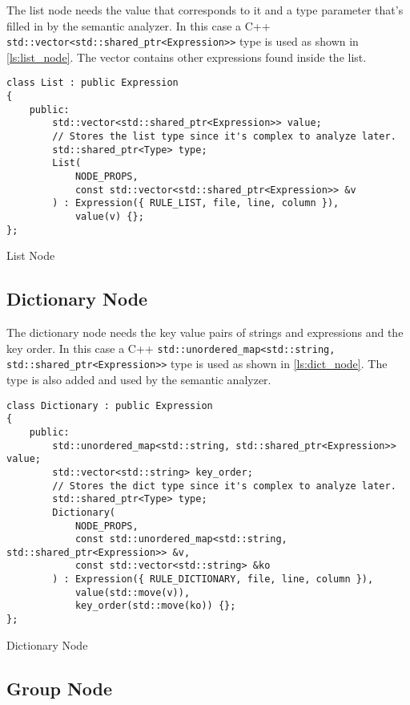 The list node needs the value that corresponds to it and a type parameter that's filled in by the semantic analyzer.
In this case a C++ \texttt{std::vector<std::shared\_ptr<Expression>>} type is used as shown in \autoref{ls:list_node}.
The vector contains other expressions found inside the list.

\begin{listing}[H]
\begin{verbatim}
class List : public Expression
{
    public:
        std::vector<std::shared_ptr<Expression>> value;
        // Stores the list type since it's complex to analyze later.
        std::shared_ptr<Type> type;
        List(
            NODE_PROPS,
            const std::vector<std::shared_ptr<Expression>> &v
        ) : Expression({ RULE_LIST, file, line, column }),
            value(v) {};
};
\end{verbatim}
\caption{List Node}
\label{ls:list_node}
\end{listing}

\subsection{Dictionary Node}

The dictionary node needs the key value pairs of strings and expressions and the key order. In this case a C++ \texttt{std::unordered\_map<std::string, std::shared\_ptr<Expression>>} type is used as shown in \autoref{ls:dict_node}. The type is also added and used by the semantic analyzer.

\begin{listing}[H]
\begin{verbatim}
class Dictionary : public Expression
{
    public:
        std::unordered_map<std::string, std::shared_ptr<Expression>> value;
        std::vector<std::string> key_order;
        // Stores the dict type since it's complex to analyze later.
        std::shared_ptr<Type> type;
        Dictionary(
            NODE_PROPS,
            const std::unordered_map<std::string, std::shared_ptr<Expression>> &v,
            const std::vector<std::string> &ko
        ) : Expression({ RULE_DICTIONARY, file, line, column }),
            value(std::move(v)),
            key_order(std::move(ko)) {};
};
\end{verbatim}
\caption{Dictionary Node}
\label{ls:dict_node}
\end{listing}

\subsection{Group Node}

